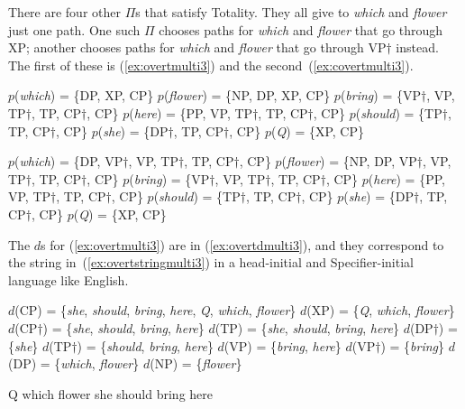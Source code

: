 \documentclass[output=paper]{langsci/langscibook}
\begin{document}
There are four other $\Pi$s that satisfy Totality. They all give to \emph{which} and \emph{flower} just one path. One such $\Pi$ chooses paths for \emph{which} and \emph{flower} that go through XP; another chooses paths for \emph{which} and \emph{flower} that go through VP$\dag$ instead. The first of these is (\ref{ex:overtmulti3}) and the second~(\ref{ex:covertmulti3}).
\begin{exe}
	\ex \label{ex:overtmulti3}
	\begin{xlist}
		\ex $p$(\emph{which}) = \{DP, XP, CP\}
		\ex $p$(\emph{flower}) = \{NP, DP, XP, CP\}
		\ex $p$(\emph{bring}) = \{VP$\dag$, VP, TP$\dag$, TP, CP$\dag$, CP\}
		\ex $p$(\emph{here}) = \{PP, VP, TP$\dag$, TP, CP$\dag$, CP\}
		\ex $p$(\emph{should}) = \{TP$\dag$, TP, CP$\dag$, CP\}
		\ex $p$(\emph{she}) = \{DP$\dag$, TP, CP$\dag$, CP\}
		\ex $p$(\emph{Q}) = \{XP, CP\}
	\end{xlist}
	\ex \label{ex:covertmulti3}
	\begin{xlist}
		\ex $p$(\emph{which}) = \{DP, VP$\dag$, VP, TP$\dag$, TP, CP$\dag$, CP\}
		\ex $p$(\emph{flower}) = \{NP, DP, VP$\dag$, VP, TP$\dag$, TP, CP$\dag$, CP\}
		\ex $p$(\emph{bring}) = \{VP$\dag$, VP, TP$\dag$, TP, CP$\dag$, CP\}
		\ex $p$(\emph{here}) = \{PP, VP, TP$\dag$, TP, CP$\dag$, CP\}
		\ex $p$(\emph{should}) = \{TP$\dag$, TP, CP$\dag$, CP\}
		\ex $p$(\emph{she}) = \{DP$\dag$, TP, CP$\dag$, CP\}
		\ex $p$(\emph{Q}) = \{XP, CP\}
	\end{xlist}
\end{exe}

The $d$s for (\ref{ex:overtmulti3}) are in (\ref{ex:overtdmulti3}), and they correspond to the string in~(\ref{ex:overtstringmulti3}) in a head-initial and Specifier-initial language like English.
\begin{exe}
	\ex \label{ex:overtdmulti3}
	\begin{xlist}
		\ex $d$(CP) = \{\emph{she}, \emph{should}, \emph{bring}, \emph{here}, \emph{Q}, \emph{which}, \emph{flower}\}
		\ex $d$(XP) = \{\emph{Q}, \emph{which}, \emph{flower}\}
		\ex $d$(CP$\dag$) = \{\emph{she}, \emph{should}, \emph{bring}, \emph{here}\}
		\ex $d$(TP) = \{\emph{she}, \emph{should}, \emph{bring}, \emph{here}\}
		\ex $d$(DP$\dag$) = \{\emph{she}\}
		\ex $d$(TP$\dag$) = \{\emph{should}, \emph{bring}, \emph{here}\}
		\ex $d$(VP) = \{\emph{bring}, \emph{here}\}
		\ex $d$(VP$\dag$) = \{\emph{bring}\}
		\ex $d$(DP) = \{\emph{which}, \emph{flower}\}
		\ex $d$(NP) = \{\emph{flower}\}
	\end{xlist}
		\ex \label{ex:overtstringmulti3} Q which flower she should bring here
\end{exe}
\end{document}
